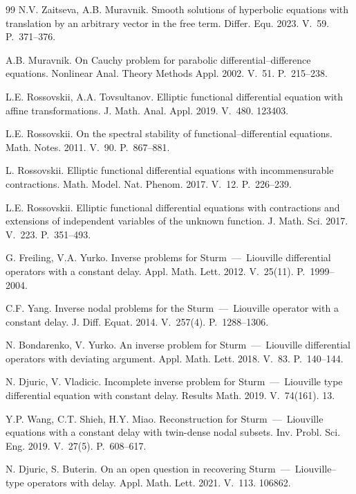 \documentclass[10pt, a4paper]{article}
\theoremstyle{plain}
\theoremstyle{definition}
\numberwithin{equation}{section}
\begin{document}
\begin{thebibliography}{99}
N.V. Zaitseva, A.B. Muravnik. Smooth solutions of hyperbolic equations with translation
by an arbitrary vector in the free term. Differ. Equ. 2023. V.~59. P.~371--376.

A.B. Muravnik. On Cauchy problem for parabolic differential--difference equations.
Nonlinear Anal. Theory Methods Appl. 2002. V.~51. P.~215--238.

L.E. Rossovskii, A.A. Tovsultanov. Elliptic functional differential equation with
affine transformations. J. Math. Anal. Appl. 2019. V.~480. 123403.

L.E. Rossovskii. On the spectral stability of functional--differential equations.
Math. Notes. 2011. V.~90. P.~867--881.

L. Rossovskii. Elliptic functional differential equations with incommensurable
contractions. Math. Model. Nat. Phenom. 2017. V.~12. P.~226--239.

L.E. Rossovskii. Elliptic functional differential equations with contractions and
extensions of independent variables of the unknown function. J. Math. Sci.
2017. V.~223. P.~351--493.

G. Freiling, V.A. Yurko. Inverse problems for Sturm~---~Liouville differential operators
with a constant delay. Appl. Math. Lett. 2012. V.~25(11). P.~1999--2004.

C.F. Yang. Inverse nodal problems for the Sturm~---~Liouville operator with a constant
delay. J. Diff. Equat. 2014. V.~257(4). P.~1288--1306.

N. Bondarenko, V. Yurko. An inverse problem for Sturm~---~Liouville differential operators
with deviating argument. Appl. Math. Lett. 2018. V.~83. P.~140--144.

N. Djuric, V. Vladicic. Incomplete inverse problem for Sturm~---~Liouville type
differential equation with constant delay. Results Math. 2019. V.~74(161). 13.

Y.P. Wang, C.T. Shieh, H.Y. Miao. Reconstruction for Sturm~---~Liouville equations
with a constant delay with twin-dense nodal subsets. Inv. Probl. Sci. Eng. 2019.
V.~27(5). P.~608--617.

N. Djuric, S. Buterin. On an open question in recovering Sturm~---~Liouville--type
operators with delay. Appl. Math. Lett. 2021. V.~113. 106862.


\end{thebibliography}
\end{document}
